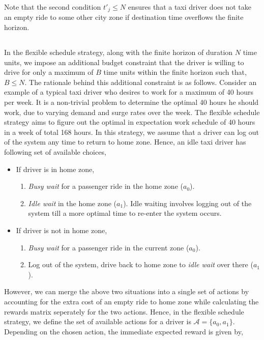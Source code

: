 Note that the second condition $t'_{j} \leq N$ ensures that a taxi driver does not take an empty ride to some other city zone if destination time overflows the finite horizon.

\subsection{\flexible}

In the flexible schedule strategy, along with the finite horizon of duration $N$ time units, we impose an additional budget constraint that the driver is willing to drive for only a maximum of $B$ time units within the finite horizon such that, $B \leq N$. The rationale behind this additional constraint is as follows. Consider an example of a typical taxi driver who desires to work for a maximum of 40 hours per week. It is a non-trivial problem to determine the optimal 40 hours he should work, due to varying demand and surge rates over the week. The flexible schedule strategy aims to figure out the optimal in expectation work schedule of 40 hours in a week of total 168 hours. In this strategy, we assume that a driver can log out of the system any time to return to home zone. Hence, an idle taxi driver has following set of available choices,

\begin{itemize}
    \item If driver is in home zone,
    \begin{enumerate}
        \item \textit{Busy wait} for a passenger ride in the home zone ($a_0$).
        \item \textit{Idle wait} in the home zone ($a_1$). Idle waiting involves logging out of the system till a more optimal time to re-enter the system occurs.
    \end{enumerate}
    \item If driver is not in home zone,
    \begin{enumerate}
        \item \textit{Busy wait} for a passenger ride in the current zone ($a_0$).
        \item Log out of the system, drive back to home zone to \textit{idle wait} over there ($a_1$).
    \end{enumerate}
\end{itemize}

However, we can merge the above two situations into a single set of actions by accounting for the extra cost of an empty ride to home zone while calculating the rewards matrix seperately for the two actions. Hence, in the flexible schedule strategy, we define the set of available actions for a driver is $\mathcal{A} = \{a_0, a_1\}$. Depending on the chosen action, the immediate expected reward is given by,

